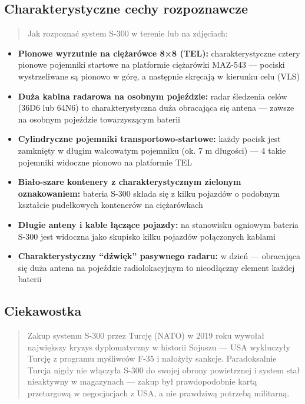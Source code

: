 \documentclass[12pt,oneside]{book}
\providecommand{\tightlist}{%
  \setlength{\itemsep}{0pt}\setlength{\parskip}{0pt}}
\begin{document}
\subsection{Charakterystyczne cechy
rozpoznawcze}\label{charakterystyczne-cechy-rozpoznawcze-42}

\begin{quote}
Jak rozpoznać system S-300 w terenie lub na zdjęciach:
\end{quote}

\begin{itemize}
\tightlist
\item
  \textbf{Pionowe wyrzutnie na ciężarówce 8×8 (TEL):} charakterystyczne
  cztery pionowe pojemniki startowe na platformie ciężarówki MAZ-543 ---
  pociski wystrzeliwane są pionowo w górę, a następnie skręcają w
  kierunku celu (VLS)
\item
  \textbf{Duża kabina radarowa na osobnym pojeździe:} radar śledzenia
  celów (36D6 lub 64N6) to charakterystyczna duża obracająca się antena
  --- zawsze na osobnym pojeździe towarzyszącym baterii
\item
  \textbf{Cylindryczne pojemniki transportowo-startowe:} każdy pocisk
  jest zamknięty w długim walcowatym pojemniku (ok. 7 m długości) --- 4
  takie pojemniki widoczne pionowo na platformie TEL
\item
  \textbf{Biało-szare kontenery z charakterystycznym zielonym
  oznakowaniem:} bateria S-300 składa się z kilku pojazdów o podobnym
  kształcie pudełkowych kontenerów na ciężarówkach
\item
  \textbf{Długie anteny i kable łączące pojazdy:} na stanowisku ogniowym
  bateria S-300 jest widoczna jako skupisko kilku pojazdów połączonych
  kablami
\item
  \textbf{Charakterystyczny ``dźwięk'' pasywnego radaru:} w dzień ---
  obracająca się duża antena na pojeździe radiolokacyjnym to nieodłączny
  element każdej baterii
\end{itemize}

\subsection{Ciekawostka}\label{ciekawostka-42}

\begin{quote}
Zakup systemu S-300 przez Turcję (NATO) w 2019 roku wywołał największy
kryzys dyplomatyczny w historii Sojuszu --- USA wykluczyły Turcję z
programu myśliwców F-35 i nałożyły sankcje. Paradoksalnie Turcja nigdy
nie włączyła S-300 do swojej obrony powietrznej i system stał nieaktywny
w magazynach --- zakup był prawdopodobnie kartą przetargową w
negocjacjach z USA, a nie prawdziwą potrzebą militarną.
\end{quote}
\end{document}
